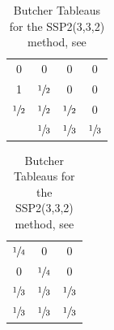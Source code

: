 \documentclass[11pt]{article}
\begin{document}
\begin{table}
    \begin{center}
        \begin{minipage}{0.25\linewidth}
            \begin{center}
                \begin{tabular}{c|ccc}
                    0              & 0              & 0              & 0              \\
                    1              & $\sfrac{1}{2}$ & 0              & 0              \\
                    $\sfrac{1}{2}$ & $\sfrac{1}{2}$ & $\sfrac{1}{2}$ & 0              \\
                    \hline
                                   & $\sfrac{1}{3}$ & $\sfrac{1}{3}$ & $\sfrac{1}{3}$
                \end{tabular}
            \end{center}
        \end{minipage}
        \hspace{4ex}
        \begin{minipage}{0.25\linewidth}
            \begin{center}
                \begin{tabular}{|ccc}
                    $\sfrac{1}{4}$ & 0              & 0              \\
                    0              & $\sfrac{1}{4}$ & 0              \\
                    $\sfrac{1}{3}$ & $\sfrac{1}{3}$ & $\sfrac{1}{3}$ \\
                    \hline
                    $\sfrac{1}{3}$ & $\sfrac{1}{3}$ & $\sfrac{1}{3}$
                \end{tabular}
            \end{center}
        \end{minipage}
        \caption{Butcher Tableaus for the SSP2(3,3,2) method, see \cite[Fig. 2]{Weller2013}}
        \label{tab:butcher_tableau_ssp2_332}
    \end{center}
\end{table}
\end{document}
